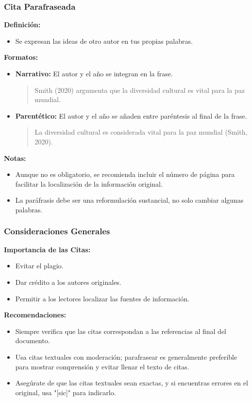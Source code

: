 \documentclass[
11pt, %
]{beamer}
\begin{document}
\begin{frame}
	\frametitle{Cita Parafraseada}

	\textbf{Definición:}
	\begin{itemize}
		\item Se expresan las ideas de otro autor en tus propias palabras.
	\end{itemize}

	\textbf{Formatos:}
	\begin{itemize}
		\item \textbf{Narrativo:} El autor y el año se integran en la frase.
		      \begin{quote}
			      Smith (2020) argumenta que la diversidad cultural es vital para la paz mundial.
		      \end{quote}
		\item \textbf{Parentético:} El autor y el año se añaden entre paréntesis al final de la frase.
		      \begin{quote}
			      La diversidad cultural es considerada vital para la paz mundial (Smith, 2020).
		      \end{quote}
	\end{itemize}

	\textbf{Notas:}
	\begin{itemize}
		\item Aunque no es obligatorio, se recomienda incluir el número de página para facilitar la localización de la información original.
		\item La paráfrasis debe ser una reformulación sustancial, no solo cambiar algunas palabras.
	\end{itemize}
\end{frame}

\begin{frame}
	\frametitle{Consideraciones Generales}

	\textbf{Importancia de las Citas:}
	\begin{itemize}
		\item Evitar el plagio.
		\item Dar crédito a los autores originales.
		\item Permitir a los lectores localizar las fuentes de información.
	\end{itemize}

	\textbf{Recomendaciones:}
	\begin{itemize}
		\item Siempre verifica que las citas correspondan a las referencias al final del documento.
		\item Usa citas textuales con moderación; parafrasear es generalmente preferible para mostrar comprensión y evitar llenar el texto de citas.
		\item Asegúrate de que las citas textuales sean exactas, y si encuentras errores en el original, usa "[sic]" para indicarlo.
	\end{itemize}
\end{frame}
\end{document}
